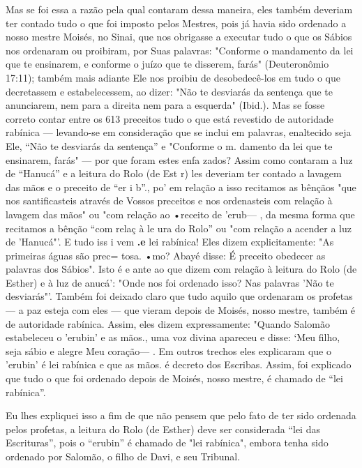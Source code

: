 Mas se foi essa a razão pela qual contaram dessa maneira, eles tam­bém
deveriam ter contado tudo o que foi imposto pelos Mestres, pois já havia
sido ordenado a nosso mestre Moisés, no Sinai, que nos obrigasse a
executar tudo o que os Sábios nos ordenaram ou proibiram, por Suas
palavras: "Confor­me o mandamento da lei que te ensinarem, e conforme o
juízo que te disse­rem, farás" (Deuteronômio 17:11); também mais adiante
Ele nos proibiu de desobedecê-los em tudo o que decretassem e
estabelecessem, ao dizer: "Não te desviarás da sentença que te
anunciarem, nem para a direita nem para a es­querda" (Ibid.). Mas se
fosse correto contar entre os 613 preceitos tudo o que está revestido de
autoridade rabínica --- levando-se em consideração que se in­clui em
palavras, enaltecido seja Ele, ``Não te desviarás da sentença'' e
"Con­forme o m. damento da lei que te ensinarem, farás" --- por que
foram estes enfa zados? Assim como contaram a luz de ``Hanucá'' e a
leitura do Rolo (de Est r) les deveriam ter contado a lavagem das mãos e
o preceito de ``er i b''., po' em relação a isso
recitamos as bênçãos "que nos santificasteis
através de Vossos preceitos e nos ordenasteis com relação à lavagem das
mãos" ou "com relação ao •receito de 'erub--- , da
mesma forma que recitamos a bên­ção ``com relaç à le ura do Rolo'' ou "com
relação a acender a luz de 'Hanu­cá"'. E tudo iss i vem
\textbf{.e} lei rabínica! Eles dizem explicitamente:
"As primeiras águas são prec= tosa. •mo? Abayé disse: É preceito
obedecer as palavras dos Sábios". Isto é e ante ao que dizem com relação
à leitura do Rolo (de Es­ther) e à luz de anucá': "Onde nos foi ordenado
isso? Nas palavras 'Não te desviarás"'. Também foi deixado claro que
tudo aquilo que ordenaram os pro­fetas --- a paz esteja com eles --- que
vieram depois de Moisés, nosso mestre, também é de autoridade rabínica.
Assim, eles dizem expressamente: "Quando Salomão estabeleceu o 'erubin'
e as mãos., uma voz divina apareceu e disse: `Meu
filho, seja sábio e alegre Meu coração--- . Em outros
trechos eles explica­ram que o 'erubin' é lei rabínica e que as
mãos. é decreto dos Escribas. Assim, foi explicado que
tudo o que foi ordenado depois de Moisés, nosso mestre, é chamado de
``lei rabínica''.

Eu lhes expliquei isso a fim de que não pensem que pelo fato de ter sido
ordenada pelos profetas, a leitura do Rolo (de Esther) deve ser
considera­da ``lei das Escrituras'', pois o ``erubin'' é chamado de "lei
rabínica", embora tenha sido ordenado por Salomão, o filho de Davi, e
seu Tribunal.

